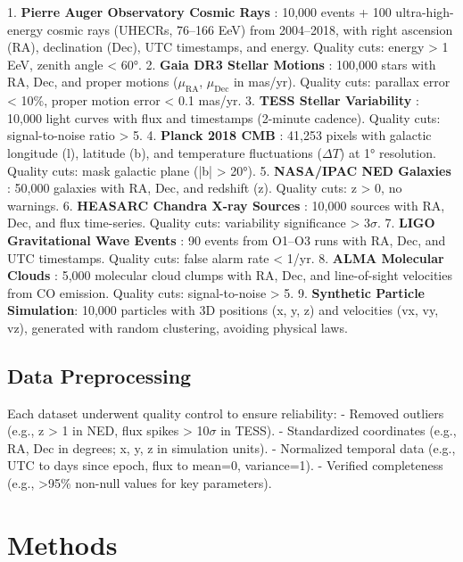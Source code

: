 \documentclass[12pt, twocolumn]{article}
\begin{document}
1. \textbf{Pierre Auger Observatory Cosmic Rays} \citep{Auger2017}: 10,000 events + 100 ultra-high-energy cosmic rays (UHECRs, 76–166 EeV) from 2004–2018, with right ascension (RA), declination (Dec), UTC timestamps, and energy. Quality cuts: energy > 1 EeV, zenith angle < 60°.
2. \textbf{Gaia DR3 Stellar Motions} \citep{Gaia2022}: 100,000 stars with RA, Dec, and proper motions ($\mu_{\text{RA}}$, $\mu_{\text{Dec}}$ in mas/yr). Quality cuts: parallax error < 10\%, proper motion error < 0.1 mas/yr.
3. \textbf{TESS Stellar Variability} \citep{TESS2018}: 10,000 light curves with flux and timestamps (2-minute cadence). Quality cuts: signal-to-noise ratio > 5.
4. \textbf{Planck 2018 CMB} \citep{Planck2020}: 41,253 pixels with galactic longitude (l), latitude (b), and temperature fluctuations ($\Delta T$) at 1° resolution. Quality cuts: mask galactic plane (|b| > 20°).
5. \textbf{NASA/IPAC NED Galaxies} \citep{NED2023}: 50,000 galaxies with RA, Dec, and redshift (z). Quality cuts: z > 0, no warnings.
6. \textbf{HEASARC Chandra X-ray Sources} \citep{Chandra2020}: 10,000 sources with RA, Dec, and flux time-series. Quality cuts: variability significance > 3$\sigma$.
7. \textbf{LIGO Gravitational Wave Events} \citep{LIGO2021}: 90 events from O1–O3 runs with RA, Dec, and UTC timestamps. Quality cuts: false alarm rate < 1/yr.
8. \textbf{ALMA Molecular Clouds} \citep{ALMA2023}: 5,000 molecular cloud clumps with RA, Dec, and line-of-sight velocities from CO emission. Quality cuts: signal-to-noise > 5.
9. \textbf{Synthetic Particle Simulation}: 10,000 particles with 3D positions (x, y, z) and velocities (vx, vy, vz), generated with random clustering, avoiding physical laws.

\subsection{Data Preprocessing}
Each dataset underwent quality control to ensure reliability:
- Removed outliers (e.g., z > 1 in NED, flux spikes > 10$\sigma$ in TESS).
- Standardized coordinates (e.g., RA, Dec in degrees; x, y, z in simulation units).
- Normalized temporal data (e.g., UTC to days since epoch, flux to mean=0, variance=1).
- Verified completeness (e.g., >95\% non-null values for key parameters).

\section{Methods}
\label{sec:methods}
\end{document}
